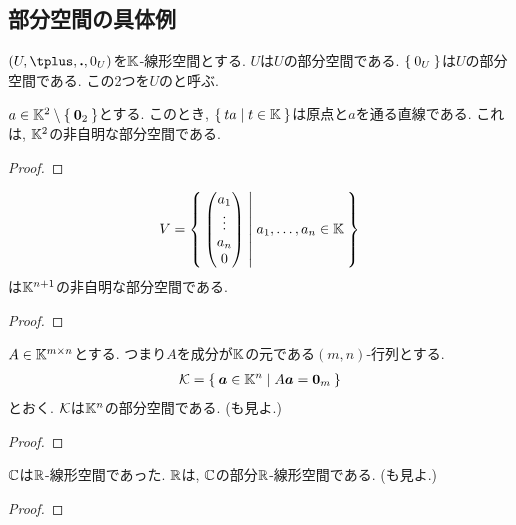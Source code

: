 \subsection{部分空間の具体例}
\label{sec:subspace:example}
\begin{example}
  $(U,\plus ,\act,0_U)$を$\mathbb{K}$-線形空間とする.
  $U$は$U$の部分空間である.
  $\Set{0_U}$は$U$の部分空間である.
  この2つを$U$のと呼ぶ.
\end{example}

\begin{example}
  $a\in \mathbb{K}^2\setminus\Set{\boldsymbol{0}_2}$とする.
  このとき, $\Set{ta|t\in \mathbb{K}}$は原点と$a$を通る直線である.
  これは, $\mathbb{K}^2$の非自明な部分空間である.
\end{example}
\begin{proof}\end{proof}


\begin{example}
  \begin{align*}
    V=\Set{\begin{pmatrix}a_1\\\vdots\\a_n\\0\end{pmatrix}|a_1,\ldots,a_n\in\mathbb{K}}
  \end{align*}
  は$\mathbb{K}^{n+1}$の非自明な部分空間である.
\end{example}
\begin{proof}\end{proof}

\begin{example}
  \label{subsp:example:fiber}
  $A\in \mathbb{K}^{m\times n}$とする.
  つまり$A$を成分が$\mathbb{K}$の元である$(m,n)$-行列とする.
  \begin{align*}
    \mathcal{K}=\Set{\boldsymbol{a}\in \mathbb{K}^n|A\boldsymbol{a}=\boldsymbol{0}_m}
  \end{align*}
  とおく. $\mathcal{K}$は$\mathbb{K}^n$の部分空間である.
  (も見よ.)
\end{example}
\begin{proof}\end{proof}

\begin{example}
  \label{subsp:example:cc}
  $\mathbb{C}$は$\mathbb{R}$-線形空間であった.
  $\mathbb{R}$は, $\mathbb{C}$の部分$\mathbb{R}$-線形空間である.
  (も見よ.)
\end{example}
\begin{proof}\end{proof}


